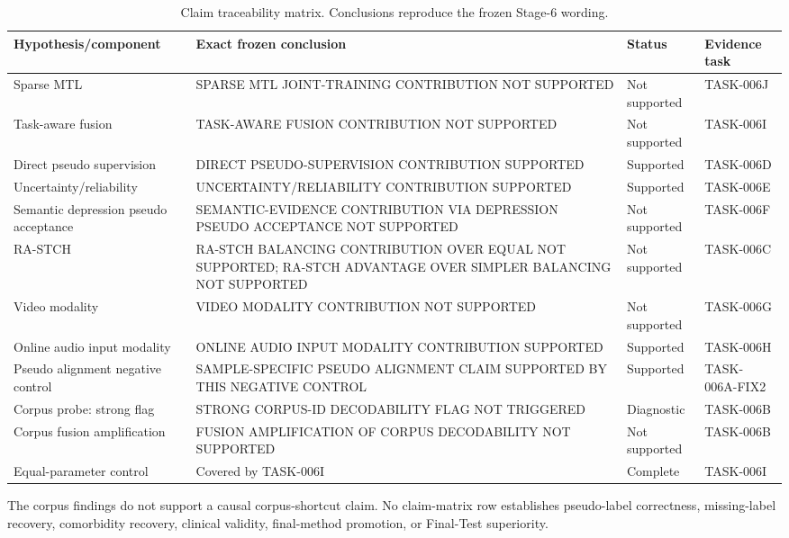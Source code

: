 \begin{table}[t]
\centering\footnotesize
\caption{Claim traceability matrix. Conclusions reproduce the frozen Stage-6 wording.}
\label{tab:app-claims}
\begin{tabular}{@{}p{}p{}p{}p{}@{}}
\toprule
Hypothesis/component & Exact frozen conclusion & Status & Evidence task\\
\midrule
Sparse MTL & SPARSE MTL JOINT-TRAINING CONTRIBUTION NOT SUPPORTED & Not supported & TASK-006J\\
Task-aware fusion & TASK-AWARE FUSION CONTRIBUTION NOT SUPPORTED & Not supported & TASK-006I\\
Direct pseudo supervision & DIRECT PSEUDO-SUPERVISION CONTRIBUTION SUPPORTED & Supported & TASK-006D\\
Uncertainty/reliability & UNCERTAINTY/RELIABILITY CONTRIBUTION SUPPORTED & Supported & TASK-006E\\
Semantic depression pseudo acceptance & SEMANTIC-EVIDENCE CONTRIBUTION VIA DEPRESSION PSEUDO ACCEPTANCE NOT SUPPORTED & Not supported & TASK-006F\\
RA-STCH & RA-STCH BALANCING CONTRIBUTION OVER EQUAL NOT SUPPORTED; RA-STCH ADVANTAGE OVER SIMPLER BALANCING NOT SUPPORTED & Not supported & TASK-006C\\
Video modality & VIDEO MODALITY CONTRIBUTION NOT SUPPORTED & Not supported & TASK-006G\\
Online audio input modality & ONLINE AUDIO INPUT MODALITY CONTRIBUTION SUPPORTED & Supported & TASK-006H\\
Pseudo alignment negative control & SAMPLE-SPECIFIC PSEUDO ALIGNMENT CLAIM SUPPORTED BY THIS NEGATIVE CONTROL & Supported & TASK-006A-FIX2\\
Corpus probe: strong flag & STRONG CORPUS-ID DECODABILITY FLAG NOT TRIGGERED & Diagnostic & TASK-006B\\
Corpus fusion amplification & FUSION AMPLIFICATION OF CORPUS DECODABILITY NOT SUPPORTED & Not supported & TASK-006B\\
Equal-parameter control & Covered by TASK-006I & Complete & TASK-006I\\
\bottomrule
\end{tabular}
\end{table}

The corpus findings do not support a causal corpus-shortcut claim. No claim-matrix row establishes pseudo-label correctness, missing-label recovery, comorbidity recovery, clinical validity, final-method promotion, or Final-Test superiority.
\FloatBarrier
